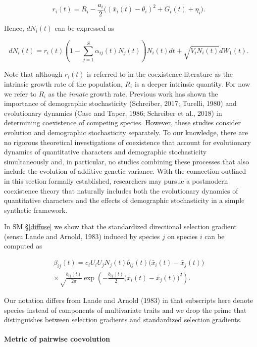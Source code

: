 \documentclass[]{elsarticle} %
\begin{document}
\begin{equation}
r_i(t)=R_i-\frac{a_i}{2}\Big((\bar x_i(t)-\theta_i)^2+G_i(t)+\eta_i\Big).
\end{equation}

Hence, \(dN_i(t)\) can be expressed as

\begin{equation}
dN_i(t)=r_i(t)\left(1-\sum_{j=1}^S\alpha_{ij}(t)N_j(t)\right)N_i(t)dt+\sqrt{V_iN_i(t)}dW_1(t).
\end{equation}

Note that although \(r_i(t)\) is referred to in the coexistence
literature as the intrinsic growth rate of the population, \(R_i\) is a
deeper intrinsic quantity. For now we refer to \(R_i\) as the
\emph{innate} growth rate. Previous work has shown the importance of
demographic stochasticity (Schreiber, 2017; Turelli, 1980) and
evolutionary dynamics (Case and Taper, 1986; Schreiber et al., 2018) in
determining coexistence of competing species. However, these studies
consider evolution and demographic stochasticity separately. To our
knowledge, there are no rigorous theoretical investigations of
coexistence that account for evolutionary dynamics of quantitative
characters and demographic stochasticity simultaneously and, in
particular, no studies combining these processes that also include the
evolution of additive genetic variance. With the connection outlined in
this section formally established, researchers may pursue a postmodern
coexistence theory that naturally includes both the evolutionary
dynamics of quantitative characters and the effects of demographic
stochasticity in a simple synthetic framework.

In SM \S\ref{diffuse} we show that the standardized directional
selection gradient (sensu Lande and Arnold, 1983) induced by species
\(j\) on species \(i\) can be computed as

\begin{multline}
\beta_{ij}(t)=c_iU_iU_jN_j(t)b_{ij}(t)\big(\bar x_i(t)-\bar x_j(t)\big) \\
\times\sqrt\frac{b_{ij}(t)}{2\pi}\exp\left(-\frac{b_{ij}(t)}{2}\big(\bar x_i(t)-\bar x_j(t)\big)^2\right).
\end{multline}

Our notation differs from Lande and Arnold (1983) in that subscripts
here denote species instead of components of multivariate traits and we
drop the prime that distinguishes between selection gradients and
standardized selection gradients.

\paragraph{Metric of pairwise coevolution}
\end{document}
